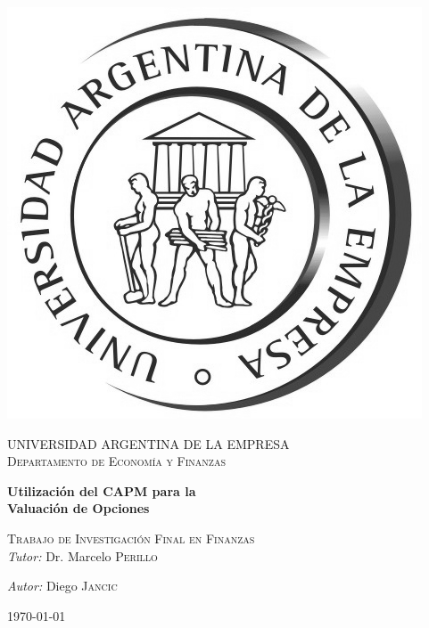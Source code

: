 
\begin{titlepage}

\begin{center}

\includegraphics[scale=0.30]{uade-logo.jpg}

\textsc{\Large UNIVERSIDAD ARGENTINA DE LA EMPRESA}\\[0.5cm]

\vspace*{0.5cm}
\textsc{\Large Departamento de Economía y Finanzas}\\[0.5cm]

\vspace*{2cm}

{ \huge \bfseries Utilización del CAPM para la \\
		Valuación de Opciones}\\[0.4cm]

\vspace*{0.5cm}

\textsc{\large Trabajo de Investigación Final en Finanzas}\\[0.5cm]




\large{\emph{Tutor:} Dr. Marcelo \textsc{Perillo}}

\vfill


\emph{Autor:} Diego \textsc{Jancic}

\vspace*{2cm}

{\large \today}

\end{center}

\end{titlepage}

